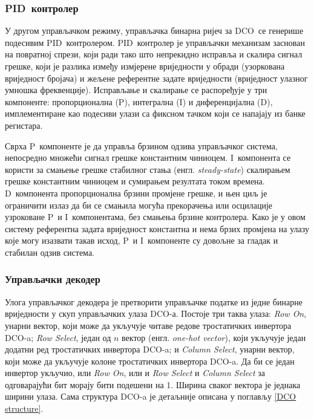 \documentclass[master]{finthesis}
\def \DCO {DCO} %
\def \PID {PID} %
\def \P   {P}   %
\def \I   {I}   %
\def \D   {D}   %
\begin{document}
\subsubsection{\PID~контролер}
У другом управљачком режиму, управљачка бинарна ријеч за \DCO\ се генерише подесивим \PID\ контролером. \PID\ контролер је управљачки механизам заснован на повратној спрези, који ради тако што непрекидно исправља и скалира сигнал грешке, који је разлика између измјерене вриједности у обради (узоркована вриједност бројача) и жељене референтне задате вриједности (вриједност улазног умношка фреквенције). Исправљање и скалирање се распоређује у три компоненте: пропорционална (\P), интегрална (\I) и диференцијална (\D), имплементиране као подесиви улази са фиксном тачком који се напајају из банке регистара. \par
Сврха \P\ компоненте је да управља брзином одзива управљачког система, непосредно множећи сигнал грешке константним чиниоцем. \I\ компонента се користи за смањење грешке стабилног стања (енгл. \textit{steady-state}) скалирањем грешке константним чиниоцем и сумирањем резултата током времена. \D\ компонента пропорционална брзини промјене грешке, и њен циљ је ограничити излаз да би се смањила могућа прекорачења или осцилације узроковане \P\ и \I\ компонентама, без смањења брзине контролера. Како је у овом систему референтна задата вриједност константна и нема брзих промјена на улазу које могу изазвати такав исход, \P\ и \I\ компоненте су довољне за гладак и стабилан одзив система.  


\subsubsection{Управљачки декодер}
Улога управљачког декодера је претворити управљачке податке из једне бинарне вриједности у скуп управљачких улаза \DCO-а. Постоје три таква улаза: \textit{Row On}, унарни вектор, који може да укључује читаве редове тростатичких инвертора \DCO-a; \textit{Row Select}, један од $n$ вектор (енгл. \textit{one-hot vector}), који укључује један додатни ред тростатичких инвертора \DCO-a; и \textit{Column Select}, унарни вектор, који може да укључује колоне тростатичких инвертора \DCO-a. Да би се један инвертор укључио, или \textit{Row On}, или и \textit{Row Select} и \textit{Column Select} за одговарајући бит морају бити подешени на 1. Ширина сваког вектора је једнака ширини улаза. Сама структура \DCO-a је детаљније описана у поглављу \ref{DCO structure}.
\end{document}
